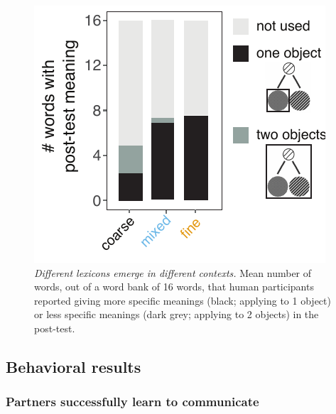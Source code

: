
\begin{figure}[t]
\begin{center}
\includegraphics[scale=1]{./figures/Exp2_postTest}
\caption{\emph{Different lexicons emerge in different contexts.} Mean number of words, out of a word bank of 16 words, that human participants reported giving more specific meanings (black; applying to 1 object) or less specific meanings (dark grey; applying to 2 objects) in the post-test.}
\label{fig:sec2postTest}
\end{center}
\end{figure}


\subsection{Behavioral results}

\subsubsection{Partners successfully learn to communicate}

